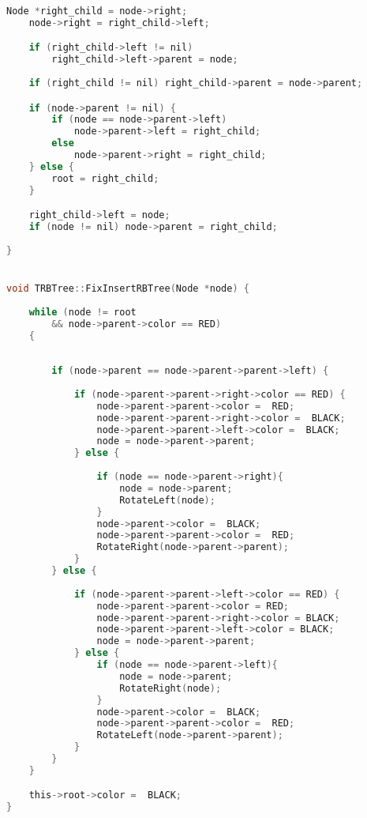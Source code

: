 \begin{lstlisting}[language=C]
    Node *right_child = node->right; 
    node->right = right_child->left;

    if (right_child->left != nil)
        right_child->left->parent = node;
    
    if (right_child != nil) right_child->parent = node->parent;

    if (node->parent != nil) {
        if (node == node->parent->left)
            node->parent->left = right_child;
        else 
            node->parent->right = right_child;
    } else {
        root = right_child;
    }

    right_child->left = node;
    if (node != nil) node->parent = right_child;
    
}


void TRBTree::FixInsertRBTree(Node *node) {
    
    while (node != root 
        && node->parent->color == RED) 
    {
     
        
        if (node->parent == node->parent->parent->left) {
            
            if (node->parent->parent->right->color == RED) { 
                node->parent->parent->color =  RED;
                node->parent->parent->right->color =  BLACK;
                node->parent->parent->left->color =  BLACK; 
                node = node->parent->parent; 
            } else {
               
                if (node == node->parent->right){ 
                    node = node->parent;
                    RotateLeft(node);
                } 
                node->parent->color =  BLACK;
                node->parent->parent->color =  RED;
                RotateRight(node->parent->parent); 
            }
        } else {
            
            if (node->parent->parent->left->color == RED) {
                node->parent->parent->color = RED;
                node->parent->parent->right->color = BLACK;
                node->parent->parent->left->color = BLACK; 
                node = node->parent->parent;
            } else {
                if (node == node->parent->left){ 
                    node = node->parent;
                    RotateRight(node); 
                } 
                node->parent->color =  BLACK;
                node->parent->parent->color =  RED;
                RotateLeft(node->parent->parent);
            }
        }
    }

    this->root->color =  BLACK;
}
\end{lstlisting}



